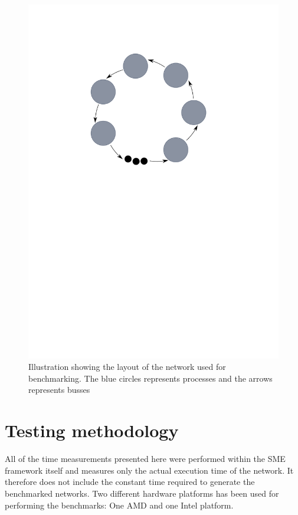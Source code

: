 \begin{figure}
\centering
\includegraphics{figures/ring}
\caption[SME network used for benchmarking]{Illustration showing the
  layout of the network used for benchmarking. The blue circles
  represents processes and the arrows represents busses}
\label{fig:benchnetwork}
\end{figure}


\section{Testing methodology}
All of the time measurements presented here were performed within the
SME framework itself and measures only the actual execution time of
the network. It therefore does not include the constant time required
to generate the benchmarked networks.
Two different hardware platforms has been used for performing the
benchmarks: One AMD and one Intel platform.

